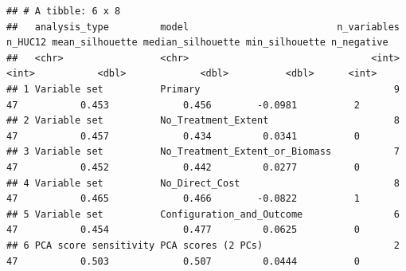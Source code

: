\documentclass[
]{article}
\begin{document}
\begin{verbatim}
## # A tibble: 6 x 8
##   analysis_type         model                          n_variables n_HUC12 mean_silhouette median_silhouette min_silhouette n_negative
##   <chr>                 <chr>                                <int>   <int>           <dbl>             <dbl>          <dbl>      <int>
## 1 Variable set          Primary                                  9      47           0.453             0.456        -0.0981          2
## 2 Variable set          No_Treatment_Extent                      8      47           0.457             0.434         0.0341          0
## 3 Variable set          No_Treatment_Extent_or_Biomass           7      47           0.452             0.442         0.0277          0
## 4 Variable set          No_Direct_Cost                           8      47           0.465             0.466        -0.0822          1
## 5 Variable set          Configuration_and_Outcome                6      47           0.454             0.477         0.0625          0
## 6 PCA score sensitivity PCA scores (2 PCs)                       2      47           0.503             0.507         0.0444          0
\end{verbatim}
\end{document}
